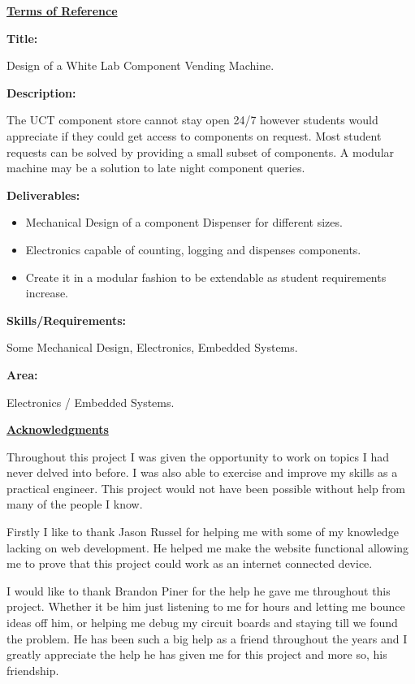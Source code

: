 \documentclass[a4paper,11pt]{article}
\numberwithin{figure}{section}
\numberwithin{table}{section}
\begin{document}
	{\centering\Huge\bfseries\underline{Terms of Reference}\par}
	{\Large\bfseries{Title:}\par}
	Design of a White Lab Component Vending Machine.\par
	{\Large\bfseries{Description:}\par}
	The UCT component store cannot stay open 24/7 however students would
appreciate if they could get access to components on request. Most student requests can be solved by providing a small subset of components. A modular machine may be a solution to late night component queries.\par
	{\Large\bfseries{Deliverables:}\par}
	{\begin{itemize}
	\item Mechanical Design of a component Dispenser for different sizes.
	\item Electronics capable of counting, logging and dispenses components.
	\item Create it in a modular fashion to be extendable as student
requirements increase.
	\end{itemize}}
	{\Large\bfseries{Skills/Requirements:}\par}
	Some Mechanical Design, Electronics, Embedded Systems.\par
	{\Large\bfseries{Area:}\par}
	Electronics / Embedded Systems.\par
	\newpage
	{\centering\Huge\bfseries\underline{Acknowledgments}\par}
	Throughout this project I was given the opportunity to work on topics I had never delved into before. I was also able to exercise and improve my skills as a practical engineer. This project would not have been possible without help from many of the people I know.
	
	Firstly I like to thank Jason Russel for helping me with some of my knowledge lacking on web development. He helped me make the website functional allowing me to prove that this project could work as an internet connected device.
	
	I would like to thank Brandon Piner for the help he gave me throughout this project. Whether it be him just listening to me for hours and letting me bounce ideas off him, or helping me debug my circuit boards and staying till we found the problem. He has been such a big help as a friend throughout the years and I greatly appreciate the help he has given me for this project and more so, his friendship.
	
\end{document}
